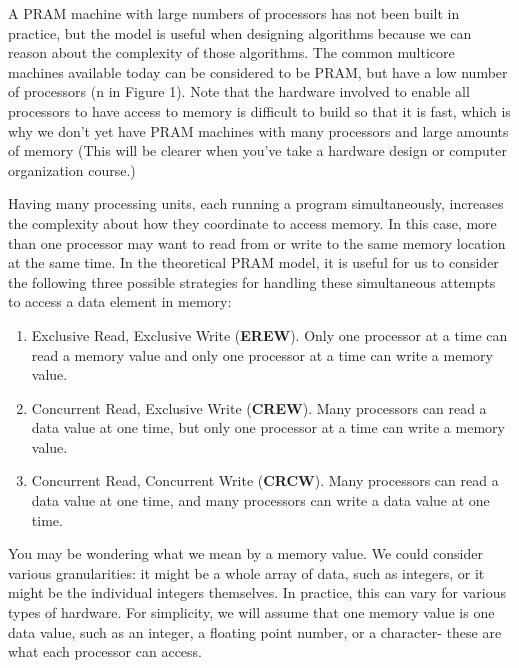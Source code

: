 \documentclass[letterpaper,10pt,openany,oneside]{sphinxmanual}
\begin{document}
A PRAM machine with large numbers of processors has not been built in practice, but the model is useful when designing algorithms because we can reason about the complexity of those algorithms.  The common multicore machines available today can be considered to be PRAM, but have a low number of processors (n in Figure 1).  Note that the hardware involved to enable all processors to have access to memory is difficult to build so that it is fast, which is why we don’t yet have PRAM machines with many processors and large amounts of memory (This will be clearer when you’ve take a hardware design or computer organization course.)

Having many processing units, each running a program simultaneously, increases the complexity about how they coordinate to access memory. In this case, more than one processor may want to read from or write to the same memory location at the same time.  In the theoretical PRAM model, it is useful for us to consider the following three possible strategies for handling these simultaneous attempts to access a data element in memory:
\begin{enumerate}
\item {} 
Exclusive Read, Exclusive Write (\textbf{EREW}).  Only one processor at a time can read a memory value and only one processor at a time can write a memory value.

\item {} 
Concurrent Read, Exclusive Write (\textbf{CREW}).  Many processors can read a data value at one time, but only one processor at a time can write a memory value.

\item {} 
Concurrent Read, Concurrent Write (\textbf{CRCW}).  Many processors can read a data value at one time, and many processors can write a data value at one time.

\end{enumerate}

You may be wondering what we mean by a memory value.  We could consider various granularities: it might be a whole array of data, such as integers, or it might be the individual integers themselves.  In practice, this can vary for various types of hardware.  For simplicity, we will assume that one memory value is one data value, such as an integer, a floating point number, or a character- these are what each processor can access.
\end{document}

